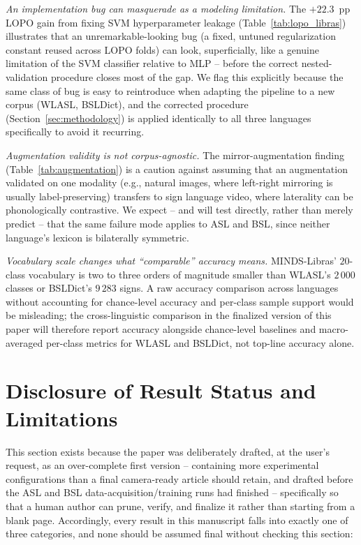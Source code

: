 \documentclass[journal]{IEEEtran}
\begin{document}
\emph{An implementation bug can masquerade as a modeling limitation.} The $+22.3$~pp LOPO gain from fixing SVM hyperparameter leakage (Table~\ref{tab:lopo_libras}) illustrates that an unremarkable-looking bug (a fixed, untuned regularization constant reused across LOPO folds) can look, superficially, like a genuine limitation of the SVM classifier relative to MLP -- before the correct nested-validation procedure closes most of the gap. We flag this explicitly because the same class of bug is easy to reintroduce when adapting the pipeline to a new corpus (WLASL, BSLDict), and the corrected procedure (Section~\ref{sec:methodology}) is applied identically to all three languages specifically to avoid it recurring.

\emph{Augmentation validity is not corpus-agnostic.} The mirror-augmentation finding (Table~\ref{tab:augmentation}) is a caution against assuming that an augmentation validated on one modality (e.g., natural images, where left-right mirroring is usually label-preserving) transfers to sign language video, where laterality can be phonologically contrastive. We expect -- and will test directly, rather than merely predict -- that the same failure mode applies to ASL and BSL, since neither language's lexicon is bilaterally symmetric.

\emph{Vocabulary scale changes what ``comparable'' accuracy means.} MINDS-Libras' $20$-class vocabulary is two to three orders of magnitude smaller than WLASL's $2\,000$ classes or BSLDict's $9\,283$ signs. A raw accuracy comparison across languages without accounting for chance-level accuracy and per-class sample support would be misleading; the cross-linguistic comparison in the finalized version of this paper will therefore report accuracy alongside chance-level baselines and macro-averaged per-class metrics for WLASL and BSLDict, not top-line accuracy alone.

\section{Disclosure of Result Status and Limitations}
\label{sec:limitations}

This section exists because the paper was deliberately drafted, at the user's request, as an over-complete first version -- containing more experimental configurations than a final camera-ready article should retain, and drafted before the ASL and BSL data-acquisition/training runs had finished -- specifically so that a human author can prune, verify, and finalize it rather than starting from a blank page. Accordingly, every result in this manuscript falls into exactly one of three categories, and none should be assumed final without checking this section:
\end{document}
